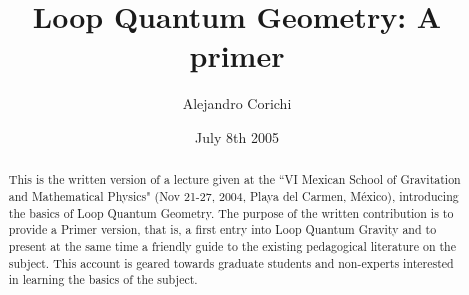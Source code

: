 \documentclass[aps,prd,tightenlines,showpacs,nofootinbib,preprint]{revtex4}
\begin{document}





\title{Loop Quantum Geometry: A primer}

\date{July 8th 2005}





\author{Alejandro Corichi}
 








\begin{abstract}
This is the written version of a lecture given at the ``VI Mexican
School of Gravitation and Mathematical Physics" (Nov 21-27, 2004,
Playa del Carmen, M\'exico), introducing the basics of Loop
Quantum Geometry. The purpose of the written contribution is to
provide a Primer version, that is, a first entry into Loop Quantum
Gravity and to present at the same time a friendly guide to the
existing pedagogical literature on the subject. This account is
geared towards graduate students and non-experts interested in
learning the basics of the subject.
\end{abstract}

 \maketitle
\end{document}
